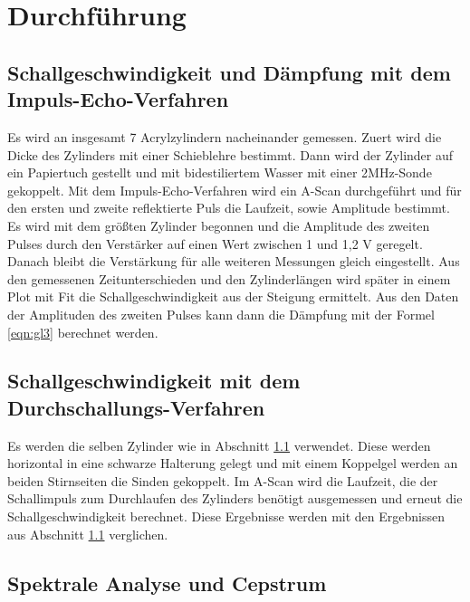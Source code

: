 \section{Durchführung}
\label{sec:Durchfuehrung}

\subsection{Schallgeschwindigkeit und Dämpfung mit dem Impuls-Echo-Verfahren}
\label{sec:impEcho}

Es wird an insgesamt 7 Acrylzylindern nacheinander gemessen.
Zuert wird die Dicke des Zylinders mit einer Schieblehre bestimmt.
Dann wird der Zylinder auf ein Papiertuch gestellt und mit bidestiliertem Wasser mit einer 2MHz-Sonde gekoppelt.
Mit dem Impuls-Echo-Verfahren wird ein A-Scan durchgeführt und für den ersten und zweite reflektierte Puls die Laufzeit, sowie Amplitude bestimmt.
Es wird mit dem größten Zylinder begonnen und die Amplitude des zweiten Pulses durch den Verstärker auf einen Wert zwischen 1 und 1,2 V geregelt.
Danach bleibt die Verstärkung für alle weiteren Messungen gleich eingestellt.
Aus den gemessenen Zeitunterschieden und den Zylinderlängen wird später in einem Plot mit Fit die Schallgeschwindigkeit aus der Steigung ermittelt.
Aus den Daten der Amplituden des zweiten Pulses kann dann die Dämpfung mit der Formel \ref{eqn:gl3} berechnet werden.

\subsection{Schallgeschwindigkeit mit dem Durchschallungs-Verfahren}
\label{sec:DurchSchall}

Es werden die selben Zylinder wie in Abschnitt \ref{sec:impEcho} verwendet.
Diese werden horizontal in eine schwarze Halterung gelegt und mit einem Koppelgel werden an beiden Stirnseiten die Sinden gekoppelt.
Im A-Scan wird die Laufzeit, die der Schallimpuls zum Durchlaufen des Zylinders benötigt ausgemessen und erneut die Schallgeschwindigkeit berechnet.
Diese Ergebnisse werden mit den Ergebnissen aus Abschnitt \ref{sec:impEcho} verglichen.

\subsection{Spektrale Analyse und Cepstrum}
\label{sec:spectral}

